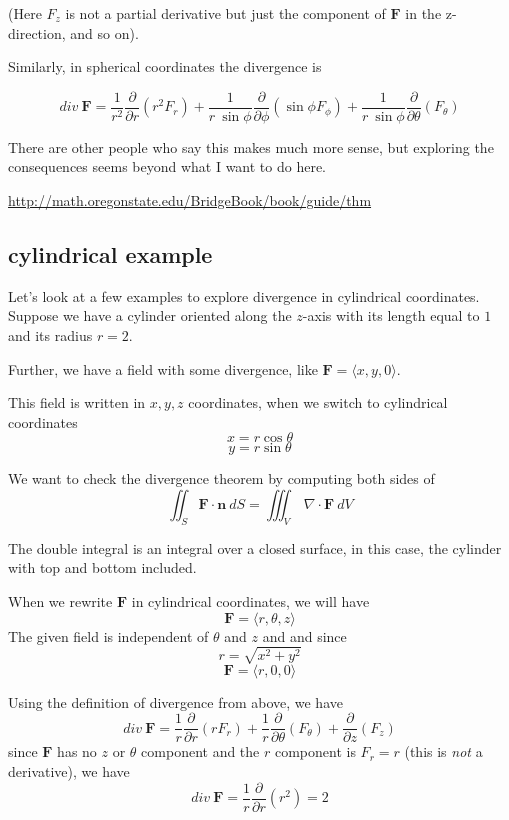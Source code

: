 \documentclass[11pt, oneside]{article}
\begin{document}
(Here $F_{z}$ is not a partial derivative but just the component of $\mathbf{F}$ in the z-direction, and so on).

Similarly, in spherical coordinates the divergence is

\[ div \  \mathbf{\mathbf{F}} = \frac{1}{r^2} \frac{\partial}{\partial r} (r^2F_r) +  \frac{1}{r \ \sin \phi} \frac{\partial}{\partial \phi} (\sin \phi F_{\phi}) + \frac{1}{r \ \sin \phi} \frac{\partial}{\partial \theta} (F_{\theta}) \]

There are other people who say this makes much more sense, but exploring the consequences seems beyond what I want to do here.

\url{http://math.oregonstate.edu/BridgeBook/book/guide/thm}

\subsection*{cylindrical example}

Let's look at a few examples to explore divergence in cylindrical coordinates.  Suppose we have a cylinder oriented along the $z$-axis with its length equal to $1$ and its radius $r=2$.  

Further, we have a field with some divergence, like $\mathbf{F} = \langle x,y,0 \rangle$.

This field is written in $x,y,z$ coordinates, when we switch to cylindrical coordinates
\[ x = r \cos \theta \]
\[ y = r \sin \theta \]

We want to check the divergence theorem by computing both sides of
\[ \iint_S \mathbf{F} \cdot \mathbf{n} \ dS  = \iiint_V \ \nabla \cdot \mathbf{F} \ dV \]

The double integral is an integral over a closed surface, in this case, the cylinder with top and bottom included. 

When we rewrite $\mathbf{F}$ in cylindrical coordinates, we will have 
\[ \mathbf{F} = \langle r, \theta, z \rangle \]
The given field is independent of $\theta$ and $z$ and and since
\[ r = \sqrt{x^2 + y^2} \]
\[ \mathbf{F} = \langle r, 0, 0 \rangle \]

Using the definition of divergence from above, we have
\[ div \ \mathbf{\mathbf{F}} = \frac{1}{r} \frac{\partial}{\partial r} (rF_r) +  \frac{1}{r} \frac{\partial}{\partial \theta} (F_{\theta}) + \frac{\partial}{\partial z} (F_z) \]
since $\mathbf{F}$ has no $z$ or $\theta$ component and the $r$ component is $F_r =r$ (this is \emph{not} a derivative), we have  
\[ div \ \mathbf{\mathbf{F}} = \frac{1}{r} \frac{\partial}{\partial r} (r^2) = 2 \]
\end{document}
